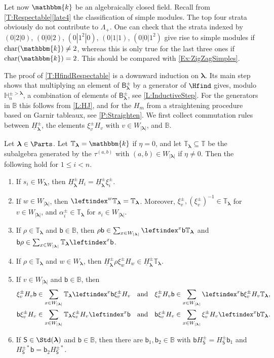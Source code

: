 \documentclass[a4paper,11pt]{amsart}
\newcommand\blam{{\boldsymbol\lambda}}
\numberwithin{equation}{subsection}
\theoremstyle{definition}
\theoremstyle{theorem}
\theoremstyle{remark}
\newcommand\HH{\mathbb{H}}
\newcommand\HJpm{\underline{H}^\pm}
\newcommand\Sym{W}
\newcommand\Basis[1][\pm]{\mathsf{B}^{#1}}
\newcommand\xipm{\xi^\pm}
\newcommand\bb{\mathsf{b}}
\newcommand\bS{{\mathsf{S}}}
\newcommand\op{\operatorname}
\newcommand\taui[1][i]{\tau^{(#1)}}
\newcommand\kk{\mathbbm{k}}
\newcommand\Tos{\mathbb{T}}
\newcommand{\Bo}{\mathbb{B}}
\begin{document}
\begin{Example}
   Let now $\kk$ be an algebraically closed field. Recall from \autoref{T:Respectable}\autoref{late4} the classification of simple modules. The  top four strata obviously do not contribute to $\Lambda_+$. One can check that the strata indexed by $(0|2|0)$, $(0|0|2)$, $(0|1^2|0)$, $(0|1|1)$, $(0|0|1^2)$ give rise to simple modules if $\op{char}(\kk)\not=2$, whereas this is only true for the last three ones if $\op{char}(\kk)=2$. This should be compared with  \autoref{Ex:ZigZagSimples}.
\end{Example}

The proof of \autoref{T:HfindRespectable} is a downward induction on $\blam$. Its main step shows
that multiplying an element of $\Basis_\blam$ by a generator of $\Hfind$ gives, modulo
$\HH^{\pm>\blam}_n$, a combination of elements of $\Basis_\blam$, see \autoref{L:InductiveStep}.
For the generators in $\Bo$ this follows from \autoref{L:HJ}, and for the $H_m$ from a
straightening procedure based on Garnir tableaux, see \autoref{P:Straighten}. We first collect commutation
rules between $\HJpm_\blam$, the elements $\xipm_vH_v$ with $v\in\Sym_{|\blam|}$, and $\Bo$.

\begin{Lemma}\label{L:HJ}
  Let $\blam\in\Parts$. Let $\Tos_\blam=\kk$ if $\eta=0$, and let
  $\Tos_\blam\subseteq\Tos$ be the subalgebra generated by the $\taui[a,b]$ with
  $(a,b)\in\Sym_{|\blam|}$ if $\eta\ne0$. Then the following hold for $1\le i<n$.
  \begin{enumerate}
  \item\label{HJ1} If $s_i\in\Sym_\blam$, then $\HJpm_\blam H_i=\HJpm_\blam\xipm_i$.
  \item\label{HJ2} If $w\in\Sym_{|\blam|}$, then $\leftindex^w{{\Tos_\blam}}=\Tos_\blam$. Moreover,
    $\xipm_v,(\xipm_v)^{-1}\in\Tos_\blam$ for $v\in\Sym_{|\blam|}$, and $\alpha^\pm_i\in\Tos_\blam$ for
    $s_i\in\Sym_{|\blam|}$.
  \item\label{HJ3} If $\rho\in\Tos_\blam$ and $\bb\in\Bo$, then
    $\rho\bb\in\sum_{x\in\Sym_{|\blam|}}\leftindex^x\bb\Tos_\blam$ and
    $\bb \rho\in\sum_{x\in\Sym_{|\blam|}}\Tos_\blam\leftindex^x\bb$.
  \item\label{HJ4} If $\rho\in\Tos_\blam$ and $w\in\Sym_\blam$, then
    $\HJpm_\blam \rho\xipm_wH_w\in\HJpm_\blam\Tos_\blam$.
  \item\label{slide2} If $v\in\Sym_{|\blam|}$ and $\bb\in\Bo$, then
    \begin{align*}
      \xipm_vH_v\bb&\in\sum_{x\in\Sym_{|\blam|}}\Tos_\blam\leftindex^x\bb\xipm_vH_v&\text{and}&&
       \xipm_vH_v\bb&\in\sum_{x\in\Sym_{|\blam|}}\leftindex^x\bb\xipm_vH_v\Tos_\blam,\\
      \bb\xipm_vH_v&\in\sum_{x\in\Sym_{|\blam|}}\Tos_\blam\xipm_vH_v\leftindex^x\bb&\text{and}&&
       \bb\xipm_vH_v&\in\sum_{x\in\Sym_{|\blam|}}\xipm_vH_v\leftindex^x\bb\Tos_\blam.
    \end{align*}
  \item\label{slide4} If $\bS\in\Std(\blam)$ and $\bb\in\Bo$, then there are $\bb_1,\bb_2\in\Bo$
    with $\bb H^\pm_\bS=H^\pm_\bS\bb_1$ and $H^{\pm*}_\bS\bb=\bb_2H^{\pm*}_\bS$.
  \end{enumerate}
\end{Lemma}
\end{document}
